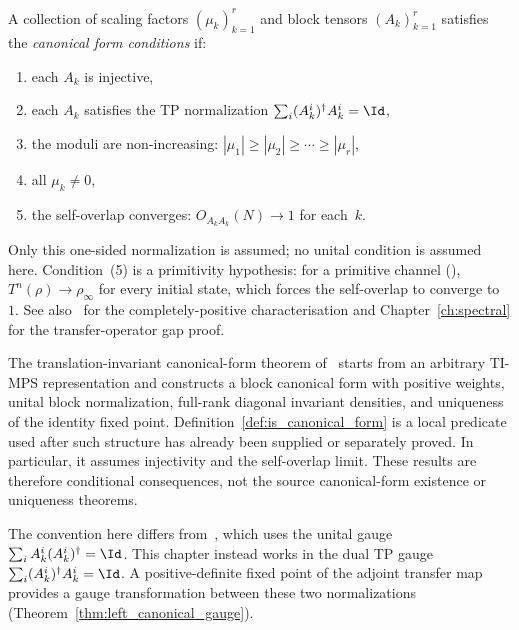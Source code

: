 \begin{definition}\label{def:is_canonical_form}
    \leanok
    A collection of scaling factors $(\mu_k)_{k=1}^r$ and
    block tensors $(A_k)_{k=1}^r$ satisfies the
    \emph{canonical form conditions} if:
    \begin{enumerate}
        \item each $A_k$ is injective,
        \item each $A_k$ satisfies the TP normalization
              $\sum_i (A_k^i)^\dagger A_k^i = \Id$,
        \item the moduli are non-increasing:
              $|\mu_1| \ge |\mu_2| \ge \cdots \ge |\mu_r|$,
        \item all $\mu_k \neq 0$,
        \item the self-overlap converges: $O_{A_k A_k}(N) \to 1$
              for each~$k$.
    \end{enumerate}
    Only this one-sided normalization is assumed;
    no unital condition is assumed here.
    Condition~(5) is a primitivity hypothesis:
    for a primitive channel
    (\cite[Theorem~6.7, item~3]{Wolf2012Quantum}),
    $T^n(\rho) \to \rho_\infty$ for every initial state,
    which forces the self-overlap to converge to~$1$.
    See also~\cite[Theorem~6.8]{Wolf2012Quantum}
    for the completely-positive characterisation
    and Chapter~\ref{ch:spectral} for the transfer-operator gap
    proof.
\end{definition}

\begin{remark}\label{rem:pgvwc07_vs_local_cf}
    The translation-invariant canonical-form theorem
    of~\cite[Theorem~Th:TIcanonical, lines~742--763]{PerezGarcia2007Matrix}
    starts from an arbitrary TI-MPS representation and constructs a block
    canonical form with positive weights, unital block normalization, full-rank
    diagonal invariant densities, and uniqueness of the identity fixed point.
    Definition~\ref{def:is_canonical_form} is a local predicate used after such
    structure has already been supplied or separately proved. In particular, it
    assumes injectivity and the self-overlap limit. These results are therefore
    conditional consequences, not the source canonical-form existence or
    uniqueness theorems.
\end{remark}

\begin{remark}\label{rem:tp_vs_unital}
    The convention here differs from~\cite[Theorem~4]{PerezGarcia2007Matrix},
    which uses the unital gauge
    $\sum_i A_k^i (A_k^i)^\dagger = \Id$.
    This chapter instead works in the dual TP gauge
    $\sum_i (A_k^i)^\dagger A_k^i = \Id$.
    A positive-definite fixed point of the adjoint transfer map provides a
    gauge transformation between these two normalizations
    (Theorem~\ref{thm:left_canonical_gauge}).
\end{remark}

